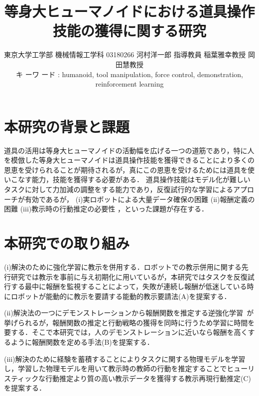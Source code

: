 \documentclass[twocolumn]{preport}
\title{等身大ヒューマノイドにおける道具操作技能の獲得に関する研究}
\author{東京大学工学部 機械情報工学科 03180266 河村洋一郎 指導教員 稲葉雅幸教授 岡田慧教授\\
  キ ーワ ード : humanoid, tool manipulation, force control, demonstration, reinforcement learning}
\begin{document}
\pagestyle{empty}
\maketitle
\thispagestyle{empty}
\sloppy

\section{本研究の背景と課題}
道具の活用は等身大ヒューマノイドの活動幅を広げる一つの道筋であり，特に人を模倣した等身大ヒューマノイドは道具操作技能を獲得できることにより多くの恩恵を受けられることが期待されるが，真にこの恩恵を受けるためには道具を使いこなす能力，技能を獲得する必要がある．
道具操作技能はモデル化が難しいタスクに対して力加減の調整をする能力であり，反復試行的な学習によるアプローチが有効であるが，
(i)実ロボットによる大量データ確保の困難
(ii)報酬定義の困難
(iii)教示時の行動推定の必要性
，といった課題が存在する．
\vspace*{-8pt}
\section {本研究での取り組み}
(i)解決のために強化学習に教示を併用する．ロボットでの教示併用に関する先行研究では教示を事前に与え初期化に用いている\cite{kober2009learning}が，本研究ではタスクを反復試行する最中に報酬を監視することによって，失敗が連続し報酬が低迷している時にロボットが能動的に教示を要請する能動的教示要請法(A)を提案する．

(ii)解決法の一つにデモンストレーションから報酬関数を推定する逆強化学習~\cite{gao2012survey}が挙げられるが，報酬関数の推定と行動戦略の獲得を同時に行うため学習に時間を要する．そこで本研究では，人のデモンストレーションに近いなら報酬を高くするように報酬関数を定める手法(B)を提案する．

(iii)解決のために経験を蓄積することによりタスクに関する物理モデルを学習し，学習した物理モデルを用いて教示時の教師の行動を推定することでヒューリスティックな行動推定より質の高い教示データを獲得する教示再現行動推定(C)を提案する．
\end{document}

